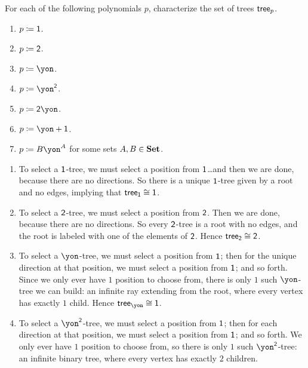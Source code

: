 \documentclass[Book-Poly]{subfiles}
\begin{document}
\begin{exercise}\label{exc.p_tree_sets}
For each of the following polynomials $p$, characterize the set of trees $\mathsf{tree}_{p}$.
\begin{enumerate}[resume]
	\item $p\coloneqq\textsf{1}$.
	\item $p\coloneqq\textsf{2}$.
	\item \label{exc.p_tree_sets.unary} $p\coloneqq\yon$.
	\item \label{exc.p_tree_sets.binary} $p\coloneqq\yon^\2$.
	\item $p\coloneqq{\2\yon}$.
	\item $p\coloneqq{\yon+\1}$.
	\item \label{exc.p_tree_sets.monomial} $p\coloneqq{B\yon^A}$ for some sets $A,B\in\mathbf{Set}$.
\qedhere
\end{enumerate}
\begin{solution}
\begin{enumerate}
    \item To select a $\textsf{1}$-tree, we must select a position from $\textsf{1}$\dots and then we are done, because there are no directions. So there is a unique $\textsf{1}$-tree given by a root and no edges, implying that $\mathsf{tree}_{\textsf{1}}\cong\textsf{1}$.
    \item To select a $\textsf{2}$-tree, we must select a position from $\textsf{2}$.
    Then we are done, because there are no directions.
    So every $\textsf{2}$-tree is a root with no edges, and the root is labeled with one of the elements of $\textsf{2}$.
    Hence $\mathsf{tree}_{\textsf{2}}\cong\textsf{2}$.
    \item To select a $\yon$-tree, we must select a position from $\textsf{1}$; then for the unique direction at that position, we must select a position from $\textsf{1}$; and so forth.
    Since we only ever have $1$ position to choose from, there is only $1$ such $\yon$-tree we can build: an infinite ray extending from the root, where every vertex has exactly $1$ child.
    Hence $\tr_\yon\iso\1$.
    \item To select a $\yon^\2$-tree, we must select a position from $\textsf{1}$; then for each direction at that position, we must select a position from $\textsf{1}$; and so forth.
    We only ever have $1$ position to choose from, so there is only $1$ such $\yon^\2$-tree: an infinite binary tree, where every vertex has exactly $2$ children.

\end{enumerate}
\end{solution}
\end{exercise}
\end{document}
